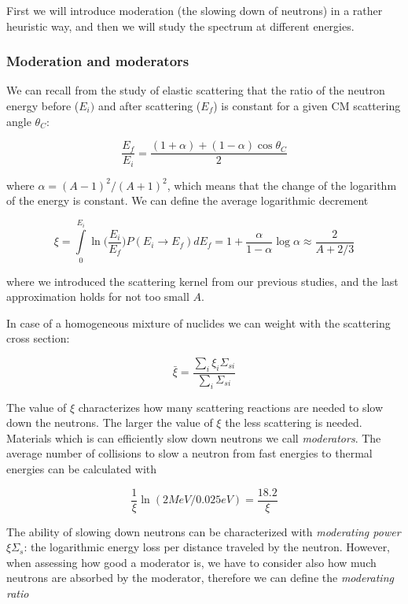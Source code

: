 First we will introduce moderation (the slowing down of neutrons) in a rather heuristic way, and then we will study the spectrum at different energies.

\subsubsection{Moderation and moderators}

We can recall from the study of elastic scattering that the ratio of the neutron energy before ($E_i)$ and after scattering ($E_f$) is constant for a given CM scattering angle $\theta_C$:

\begin{equation}\label{eq:muErelation2}
\frac{E_f}{E_i}=\frac{(1+\alpha)+(1-\alpha)\cos\theta_C}{2}
\end{equation}

\noindent where $\alpha=(A-1)^2/(A+1)^2$, which means that the change of the logarithm of the energy is constant. We can define the average logarithmic decrement

\begin{equation}
\xi = \int\limits_0^{E_i}\ln\Big(\frac{E_i}{E_f}\Big)P(E_i\rightarrow E_f)dE_f=1+\frac{\alpha}{1-\alpha}\log\alpha \approx \frac{2}{A+2/3}
\end{equation}

\noindent where we introduced the scattering kernel from our previous studies, and the last approximation holds for not too small $A$.

In case of a homogeneous mixture of nuclides we can weight with the scattering cross section:

$$\bar\xi = \frac{\sum_i\xi_i\Sigma_{si}}{\sum_i\Sigma_{si}}$$

The value of $\xi$ characterizes how many scattering reactions are needed to slow down the neutrons. The larger the value of $\xi$ the less scattering is needed. Materials which is can efficiently slow down neutrons we call \textit{moderators}. The average number of collisions to slow a neutron from fast energies to thermal energies can be calculated with

$$\frac{1}{\xi}\ln(2 MeV/0.025 eV)=\frac{18.2}{\xi}$$

The ability of slowing down neutrons can be characterized with \textit{moderating power} $\xi\Sigma_s$: the logarithmic energy loss per distance traveled by the neutron. However, when assessing how good a moderator is, we have to consider also how much neutrons are absorbed by the moderator, therefore we can define the \textit{moderating ratio}

